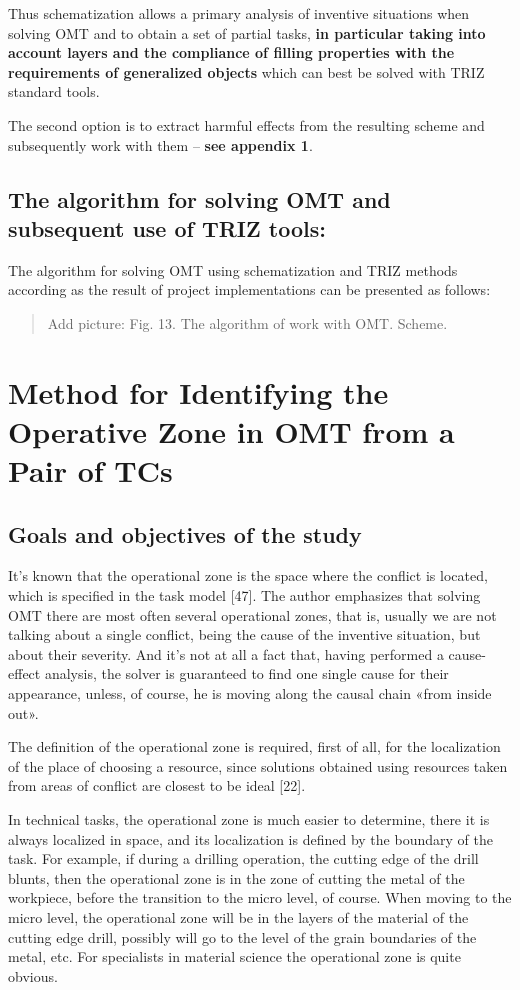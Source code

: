 \documentclass[11pt,a4paper]{book}
\newcommand{\addpicture}[1]{
  \begin{quote} Add picture: #1\end{quote}
}
\begin{document}
Thus schematization allows a primary analysis of inventive situations when
solving OMT and to obtain a set of partial tasks, \textbf{in particular taking
  into account layers and the compliance of filling properties with the
  requirements of generalized objects} which can best be solved with TRIZ
standard tools.

The second option is to extract harmful effects from the resulting scheme and
subsequently work with them -- \textbf{see appendix 1}.

\section[The algorithm]{The algorithm for solving OMT and subsequent use of
  TRIZ tools:}

The algorithm for solving OMT using schematization and TRIZ methods according
as the result of project implementations can be presented as follows:

\addpicture{Fig. 13. The algorithm of work with OMT. Scheme.}

\chapter[Identifying the operative zone]{Method for Identifying the Operative
  Zone in OMT from a Pair of TCs}

\section{Goals and objectives of the study}

It’s known that the operational zone is the space where the conflict is
located, which is specified in the task model [47]. The author emphasizes that
solving OMT there are most often several operational zones, that is, usually
we are not talking about a single conflict, being the cause of the inventive
situation, but about their severity. And it’s not at all a fact that, having
performed a cause-effect analysis, the solver is guaranteed to find one single
cause for their appearance, unless, of course, he is moving along the causal
chain «from inside out».

The definition of the operational zone is required, first of all, for the
localization of the place of choosing a resource, since solutions obtained
using resources taken from areas of conflict are closest to be ideal [22].

In technical tasks, the operational zone is much easier to determine, there it
is always localized in space, and its localization is defined by the boundary
of the task. For example, if during a drilling operation, the cutting edge of
the drill blunts, then the operational zone is in the zone of cutting the
metal of the workpiece, before the transition to the micro level, of course.
When moving to the micro level, the operational zone will be in the layers of
the material of the cutting edge drill, possibly will go to the level of the
grain boundaries of the metal, etc. For specialists in material science
the operational zone is quite obvious.
\end{document}
